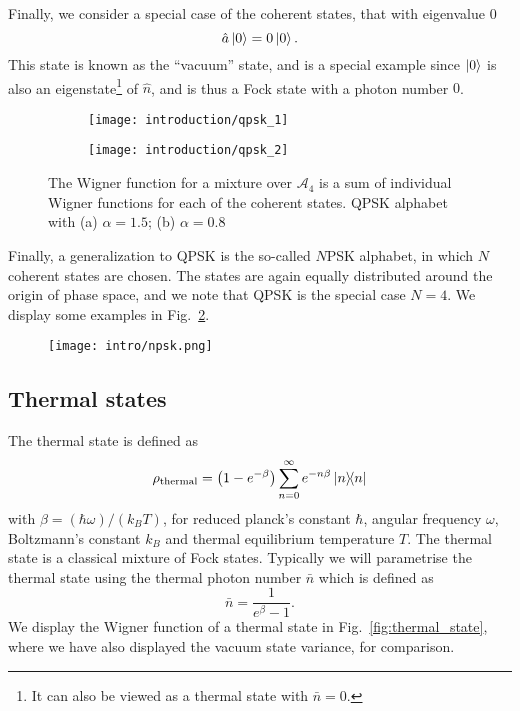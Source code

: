 Finally, we consider a special case of the coherent states, that with eigenvalue $0$
\begin{equation}
\hat{a} \ket{0} = 0 \ket{0}.
\end{equation}
\noindent This state is known as the ``vacuum'' state, and is a special example since $\ket{0}$ is also an eigenstate\footnote{It can also be viewed as a thermal state with $\bar{n}=0$.} of $\hat{n}$, and is thus a Fock state with a photon number $0$.


\begin{figure}[htp]
\captionsetup{width=0.8\linewidth}
\centering
\begin{subfigure}[b]{0.4\linewidth}
\texttt{[image: introduction/qpsk\_1]}
\caption{}
\end{subfigure}
\begin{subfigure}[b]{0.4\linewidth}
\texttt{[image: introduction/qpsk\_2]}
\caption{}
\end{subfigure}
\caption{\label{fig:qpsk} The Wigner function for a mixture over $\mathcal{A}_4$ is a sum of individual Wigner functions for each of the coherent states. QPSK alphabet with (a) $\alpha=1.5$; (b) $\alpha=0.8$ }
\end{figure}

Finally, a generalization to QPSK is the so-called $N$PSK alphabet, in which $N$ coherent states are chosen. The states are again equally distributed around the origin of phase space, and we note that QPSK is the special case $N=4$. We display some examples in Fig.~\ref{fig:intro_npsk}.

\begin{figure}[htp]
\captionsetup{width=0.8\linewidth}
\centering
\texttt{[image: intro/npsk.png]}
\caption{\label{fig:intro_npsk}}
\end{figure}

\FloatBarrier
\subsection{Thermal states}

The thermal state is defined as
\begin{equation}
\rho_{\text{thermal}} = \left( 1 - e^{-\beta} \right) \sum_{n=0}^\infty e^{- n \beta} \dyad{n}
\end{equation}
with $\beta = \left( \hbar \omega \right)/\left(k_B T\right)$, for reduced planck's constant $\hbar$, angular frequency $\omega$, Boltzmann's constant $k_B$ and thermal equilibrium temperature $T$. The thermal state is a classical mixture of Fock states. Typically we will parametrise the thermal state using the thermal photon number $\bar{n}$ which is defined as 
\begin{equation}
\bar{n} = \frac{1}{e^\beta - 1}.
\end{equation}
We display the Wigner function of a thermal state in Fig.~\ref{fig:thermal_state}, where we have also displayed the vacuum state variance, for comparison.


